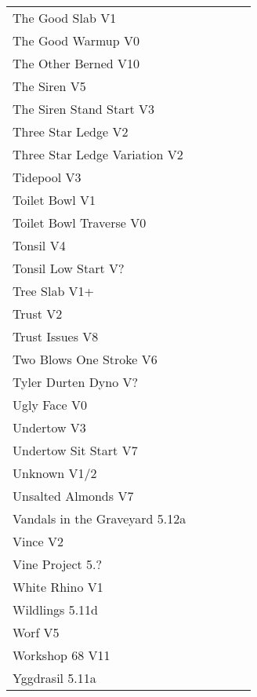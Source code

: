 \begin{flushleft}
\begin{center}
\begin{supertabular}{p{0.76\linewidth}p{0.08\linewidth}}
The Good Slab V1 & \pageref{rt:The Good Slab} \\
The Good Warmup V0 & \pageref{rt:The Good Warmup} \\
The Other Berned V10 & \pageref{rt:The Other Berned} \\
The Siren V5 & \pageref{rt:The Siren} \\
The Siren Stand Start V3 & \pageref{vr:The Siren Stand Start} \\
Three Star Ledge V2 & \pageref{rt:Three Star Ledge} \\
Three Star Ledge Variation V2 & \pageref{vr:Three Star Ledge Variation} \\
Tidepool V3 & \pageref{rt:Tidepool} \\
Toilet Bowl V1 & \pageref{rt:Toilet Bowl} \\
Toilet Bowl Traverse V0 & \pageref{rt:Toilet Bowl Traverse} \\
Tonsil V4 & \pageref{rt:Tonsil} \\
Tonsil Low Start V? & \pageref{vr:Tonsil Low Start} \\
Tree Slab V1+ & \pageref{rt:Tree Slab} \\
Trust V2 & \pageref{rt:Trust} \\
Trust Issues V8 & \pageref{rt:Trust Issues} \\
Two Blows One Stroke V6 & \pageref{rt:Two Blows One Stroke} \\
Tyler Durten Dyno V? & \pageref{vr:Tyler Durten Dyno} \\
Ugly Face V0 & \pageref{rt:Ugly Face} \\
Undertow V3 & \pageref{rt:Undertow} \\
Undertow Sit Start V7 & \pageref{vr:Undertow Sit Start} \\
Unknown V1/2 & \pageref{rt:Unknown} \\
Unsalted Almonds V7 & \pageref{rt:Unsalted Almonds} \\
Vandals in the Graveyard 5.12a & \pageref{rt:Vandals in the Graveyard} \\
Vince V2 & \pageref{rt:Vince} \\
Vine Project 5.? & \pageref{rt:Vine Project} \\
White Rhino V1 & \pageref{rt:White Rhino} \\
Wildlings 5.11d & \pageref{rt:Wildlings} \\
Worf V5 & \pageref{rt:Worf} \\
Workshop 68 V11 & \pageref{vr:Workshop 68} \\
Yggdrasil 5.11a & \pageref{rt:Yggdrasil} \\
\end{supertabular}
\end{center}


\end{flushleft}
